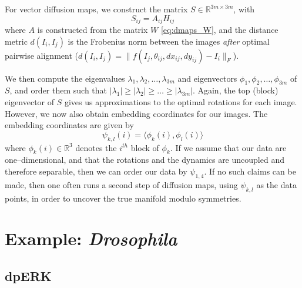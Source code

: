 \documentclass[11pt]{article}
\begin{document}
For vector diffusion maps, we construct the matrix $S \in \mathbb{R}^{3m \times 3m}$, with
\begin{equation}
	S_{ij} = A_{ij} H_{ij}
\end{equation}
%
where $A$ is constructed from the matrix $W$ \eqref{eq:dmaps_W}, and the distance metric $d(I_i, I_j)$ is the Frobenius norm between the images {\em after} optimal pairwise alignment ($d(I_i, I_j) = \| f(I_j, \theta_{ij}, dx_{ij}, dy_{ij}) - I_i \|_F$).

We then compute the eigenvalues $\lambda_1, \lambda_2, \dots, \lambda_{3m}$ and eigenvectors $\phi_1, \phi_2, \dots, \phi_{3m}$ of $S$, and order them such that $|\lambda_1| \ge |\lambda_2| \ge \dots \ge |\lambda_{3m}|$.
%
Again, the top (block) eigenvector of $S$ gives us approximations to the optimal rotations for each image.
%
However, we now also obtain embedding coordinates for our images.
%
The embedding coordinates are given by 
\begin{equation}
\psi_{k,l} (i) = \langle \phi_k(i), \phi_l(i) \rangle
\end{equation}
where $\phi_k(i) \in \mathbb{R}^3$ denotes the $i^{th}$ block of $\phi_k$.
%
If we assume that our data are one--dimensional, and that the rotations and the dynamics are uncoupled and therefore separable, then we can order our data by $\psi_{1,4}$.
%
If no such claims can be made, then one often runs a second step of diffusion maps, using $\psi_{k,l}$ as the data points, in order to uncover the true manifold modulo symmetries. 


\section{Example: {\em Drosophila}}

\subsection{dpERK}
\end{document}
